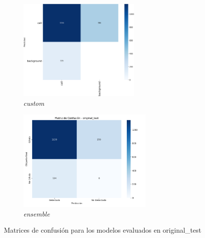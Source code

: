 \documentclass[12pt,a4paper,onecolumn,oneside]{report}
\begin{document}
\begin{figure}[H]
  \vspace{0.1cm}
  \begin{subfigure}[b]{0.45\textwidth}
    \centering
    \includegraphics[height=5cm]{figuras/resultados experimentacion/custom/original_test/confusion_matrix.png}
    \vspace{-0.3cm}
    \caption{\footnotesize \textit{custom}}
    \label{fig:confusion_custom_original_test}
  \end{subfigure}
  \hfill
  \begin{subfigure}[b]{0.45\textwidth}
    \centering
    \includegraphics[height=5cm]{figuras/resultados experimentacion/ensemble/confusion_matrices/confusion_matrix_original_test.png}
    \vspace{-0.3cm}
    \caption{\footnotesize \textit{ensemble}}
    \label{fig:confusion_ensemble_original_test}
  \end{subfigure}
  
  \vspace{-0.2cm}
  \caption{Matrices de confusión para los modelos evaluados en original\_test}
  \label{fig:confusion_matrices_original_test}
\end{figure}
\end{document}
